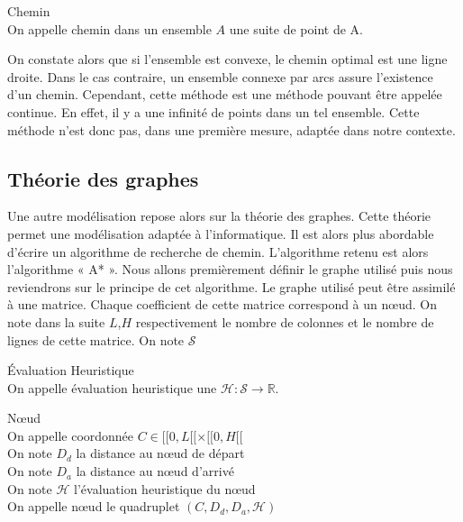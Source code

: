 \begin{definition} Chemin \\
    On appelle chemin dans un ensemble $A$ une suite de point de A.
\end{definition} 

On constate alors que si l’ensemble est convexe, le chemin optimal est une ligne droite. Dans le cas contraire, un ensemble 
connexe par arcs assure l’existence d’un chemin. Cependant, cette méthode est une méthode pouvant être appelée continue. 
En effet, il y a une infinité de points dans un tel ensemble. Cette méthode n’est donc pas, dans une première mesure, 
adaptée dans notre contexte.

\subsection{Théorie des graphes}

Une autre modélisation repose alors sur la théorie des graphes. Cette théorie permet une modélisation adaptée à l’informatique. 
Il est alors plus abordable d’écrire un algorithme de recherche de chemin.
L’algorithme retenu est alors l’algorithme « A* ». 
Nous allons premièrement définir le graphe utilisé puis nous reviendrons sur le principe de cet algorithme.
Le graphe utilisé peut être assimilé à une matrice. Chaque coefficient de cette matrice correspond à un nœud. 
On note dans la suite $L$,$H$ respectivement le nombre de colonnes et le nombre de lignes de cette matrice. On note $\mathcal{S}$ 

\begin{definition} Évaluation Heuristique \\
    On appelle évaluation heuristique une $\mathcal{H} : \mathcal{S} \longrightarrow \mathbb{R}$.
\end{definition} 

\begin{definition} Nœud \\
    On appelle coordonnée $C \in [\![0,L[\![ \times [\![0,H[\![$ \\
    On note $D_d$ la distance au nœud de départ \\
On note $D_a$ la distance au nœud d’arrivé \\
On note $\mathcal H$ l’évaluation heuristique du nœud \\
On appelle nœud le quadruplet $(C,D_d,D_a,\mathcal H)$ \\
\end{definition}

